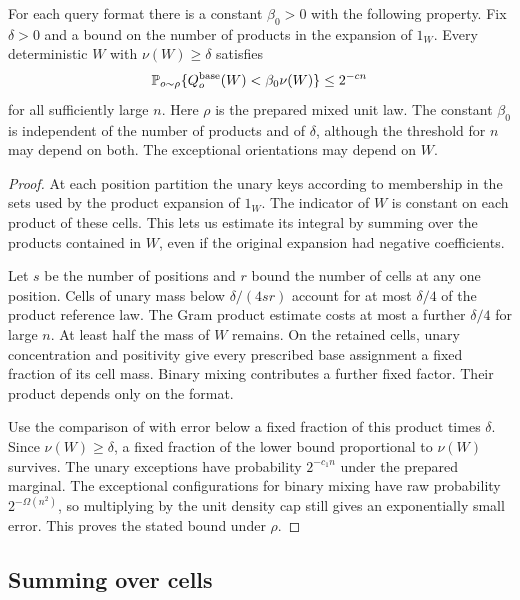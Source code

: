 \begin{lemma}\label{lem:base-product-hits}
For each query format there is a constant \(\beta_0>0\) with the
following property. Fix \(\delta>0\) and a bound on the number of
products in the expansion of \(1_W\). Every deterministic \(W\) with
\(\nu(W)\ge\delta\) satisfies
\[
 \mathbb P_{o\sim\rho}\{Q_o^{\rm base}(W)<\beta_0\nu(W)\}\le2^{-cn}
\]
for all sufficiently large \(n\). Here \(\rho\) is the prepared mixed
unit law. The constant \(\beta_0\) is independent of the number of
products and of \(\delta\), although the threshold for \(n\) may depend
on both.
The exceptional orientations may depend on \(W\).
\end{lemma}
\begin{proof}
At each position partition the unary keys according to membership
in the sets used by the product expansion of \(1_W\). The indicator
of \(W\) is constant on each product of these cells. This lets us
estimate its integral by summing over the products contained in \(W\),
even if the original expansion had negative coefficients.

Let \(s\) be the number of positions and \(r\) bound the number of
cells at any one position. Cells of unary mass below \(\delta/(4sr)\)
account for at most \(\delta/4\) of the product reference law. The
Gram product estimate costs at most a further \(\delta/4\) for
large \(n\). At least half the mass of \(W\) remains. On the retained
cells, unary concentration and positivity give every prescribed base
assignment a fixed fraction of its cell mass. Binary mixing contributes
a further fixed factor. Their product depends only on the format.

Use the comparison of  with error below a fixed
fraction of this product times \(\delta\). Since \(\nu(W)\ge\delta\),
a fixed fraction of the lower bound proportional to \(\nu(W)\)
survives. The unary exceptions have probability \(2^{-c_1n}\) under
the prepared marginal. The exceptional configurations for binary mixing
have raw probability \(2^{-\Omega(n^2)}\), so multiplying by the unit
density cap still gives an exponentially small error. This proves the
stated bound under \(\rho\).

\end{proof}

\subsection{Summing over cells}

